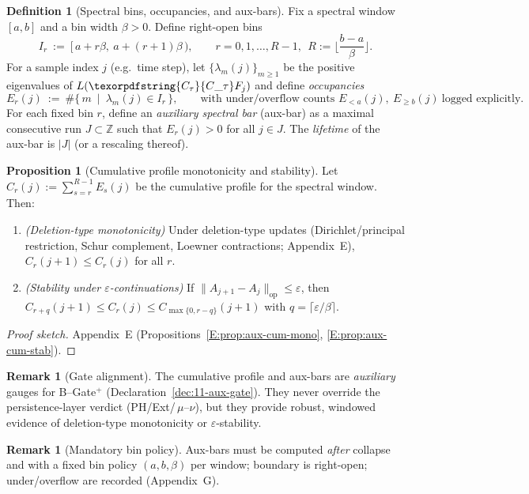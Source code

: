 \documentclass[11pt]{article}
\numberwithin{equation}{section}
\theoremstyle{plain}
\theoremstyle{definition}
\theoremstyle{remark}
\theoremstyle{plain}
\theoremstyle{definition}
\numberwithin{equation}{section}
\newtheorem{proposition}[theorem]{Proposition}
\theoremstyle{definition}
\newtheorem{definition}[theorem]{Definition}
\newtheorem{remark}[theorem]{Remark}
\DeclareRobustCommand{\Ctau}{\texorpdfstring{\ensuremath{C_{\tau}}}{C\_\tau}}
\numberwithin{equation}{section}
\theoremstyle{plain}
\theoremstyle{definition}
\theoremstyle{remark}
\providecommand{\Cfun}[1]{\mathsf{C}_{#1}}
\providecommand{\Ctau}{\Cfun{\tau}}
\begin{document}
\begin{definition}[Spectral bins, occupancies, and aux-bars]\label{def:11-aux-bars}
Fix a spectral window $[a,b]$ and a bin width $\beta>0$. Define right-open bins
\[
I_r\ :=\ [\,a+r\beta,\ a+(r+1)\beta\,),\qquad r=0,1,\dots,R-1,\ \ R:=\Big\lfloor\frac{b-a}{\beta}\Big\rfloor.
\]
For a sample index $j$ (e.g.\ time step), let $\{\lambda_m(j)\}_{m\ge 1}$ be the positive eigenvalues of $L(\Ctau F_j)$ and define \emph{occupancies}
\[
E_r(j)\ :=\ \#\{\,m\ \mid\ \lambda_m(j)\in I_r\,\},\qquad \text{with under/overflow counts }E_{<a}(j),\ E_{\ge b}(j)\ \text{logged explicitly}.
\]
For each fixed bin $r$, define an \emph{auxiliary spectral bar} (aux-bar) as a maximal consecutive run $J\subset\mathbb{Z}$ such that $E_r(j)>0$ for all $j\in J$. The \emph{lifetime} of the aux-bar is $|J|$ (or a rescaling thereof).
\end{definition}

\begin{proposition}[Cumulative profile monotonicity and stability]\label{prop:11-cum}
Let $C_r(j):=\sum_{s=r}^{R-1}E_s(j)$ be the cumulative profile for the spectral window. Then:
\begin{enumerate}
\item \emph{(Deletion-type monotonicity)} Under deletion-type updates (Dirichlet/principal restriction, Schur complement, Loewner contractions; Appendix~E), $C_r(j\!+\!1)\le C_r(j)$ for all $r$.
\item \emph{(Stability under $\varepsilon$-continuations)} If $\|A_{j+1}-A_j\|_{\mathrm{op}}\le\varepsilon$, then $C_{r+q}(j+1)\le C_r(j)\le C_{\max\{0,r-q\}}(j+1)$ with $q=\lceil\varepsilon/\beta\rceil$.
\end{enumerate}
\end{proposition}

\begin{proof}[Proof sketch]
Appendix~E (Propositions~\ref{E:prop:aux-cum-mono}, \ref{E:prop:aux-cum-stab}).
\end{proof}

\begin{remark}[Gate alignment]
The cumulative profile and aux-bars are \emph{auxiliary} gauges for B--Gate$^{+}$ (Declaration~\ref{dec:11-aux-gate}). They never override the persistence-layer verdict (PH/Ext/\,$\mu$--$\nu$), but they provide robust, windowed evidence of deletion-type monotonicity or $\varepsilon$-stability.
\end{remark}

\begin{remark}[Mandatory bin policy]\label{rk:11-bin}
Aux-bars must be computed \emph{after} collapse and with a fixed bin policy $(a,b,\beta)$ per window; boundary is right-open; under/overflow are recorded (Appendix~G).
\end{remark}
\end{document}
